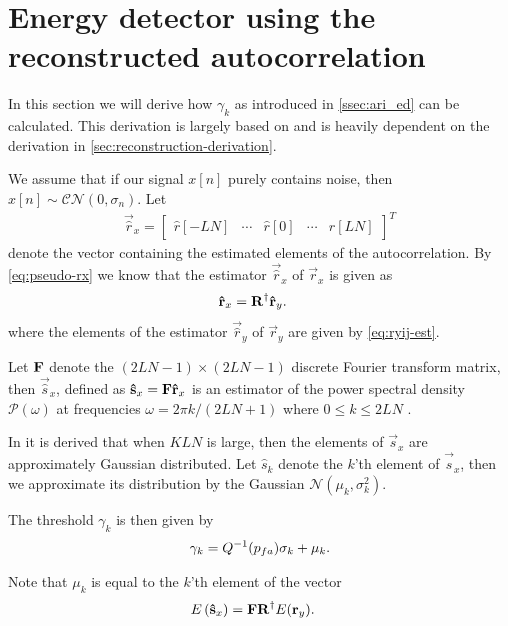 \documentclass[a4paper, openany, oneside]{memoir}
\begin{document}
\section{Energy detector using the reconstructed autocorrelation}\label{sec:ari_ed_deriv}
In this section we will derive how $\gamma_k$ as introduced in \cref{ssec:ari_ed} can be calculated. This derivation is largely based on \cite{ariananda2012compressive} and is heavily dependent on the derivation in \cref{sec:reconstruction-derivation}.

We assume that if our signal $x[n]$ purely contains noise, then $x[n] \sim \mathcal{CN}(0,\sigma_n)$. 
Let
\begin{align*}
    \vec{\hat{r}}_x = \begin{bmatrix}\hat{r}[-LN]& \cdots& \hat{r}[0]& \cdots & \hat{r}[LN]\end{bmatrix}^T
\end{align*}
denote the vector containing the estimated elements of the autocorrelation. 
By \cref{eq:pseudo-rx} we know that the estimator $\vec{\hat{r}}_x$ of $\vec{r}_x$ is given as
\begin{align*}
\vec{\hat{r}}_x &= \mat{R}^{\dagger}\vec{\hat{r}}_y.
\end{align*} where the elements of the estimator $\vec{\hat{r}}_y$ of $\vec{r}_y$ are given by \cref{eq:ryij-est}.

Let $\mat{F}$ denote the $(2LN-1) \times (2LN-1)$ discrete Fourier transform matrix, then $\vec{\hat{s}}_x$, defined as
$\vec{\hat{s}}_x = \mat{F} \vec{\hat{r}}_x$
is an estimator of the power spectral density $\mathcal{P}(\omega)$ at frequencies $\omega = 2\pi k/(2LN+1)$ where $0 \leq k \leq 2LN$ .

In \cite{ariananda2012compressive} it is derived that when $KLN$ is large, then the elements of $\vec{s}_x$ are approximately Gaussian distributed. Let $\hat{s}_k$ denote the $k$'th element of $\vec{\hat{s}}_x$, then we approximate its distribution by the Gaussian $\mathcal{N}(\mu_k, \sigma^2_k)$.

The threshold $\gamma_k$ is then given by 
\begin{align}\label{eq:ari_threshold}
\gamma_k = Q^{-1}(p\ss{fa})\sigma_{k} + \mu_{k}.
\end{align}

Note that $\mu_k$ is equal to the $k$'th element of the vector
\begin{align*}
E\left(\vec{\hat{s}}_x\right) &= \mat{F}\mat{R}^{\dagger}E(\vec{r}_y).
\end{align*}
\end{document}
